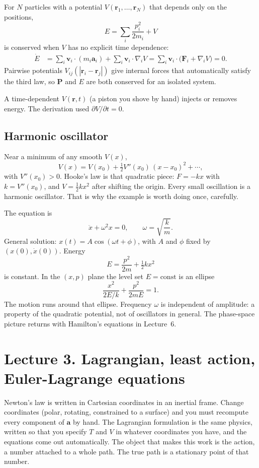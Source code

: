 \documentclass[11pt]{article}
\numberwithin{equation}{section}
\newcommand{\vect}[1]{\mathbf{#1}}
\begin{document}
For $N$ particles with a potential $V(\vect{r}_1,\ldots,\vect{r}_N)$ that depends only on the positions,
\[
E = \sum_i \frac{p_i^2}{2m_i} + V
\]
is conserved when $V$ has no explicit time dependence:
\begin{align*}
\dot E
&= \sum_i \vect{v}_i\cdot(m_i\vect{a}_i)
+ \sum_i \vect{v}_i\cdot\nabla_i V
= \sum_i \vect{v}_i\cdot\bigl(\vect{F}_i + \nabla_i V\bigr)
= 0.
\end{align*}
Pairwise potentials $V_{ij}(|\vect{r}_i-\vect{r}_j|)$ give internal forces that automatically satisfy the third law, so $\vect{P}$ and $E$ are both conserved for an isolated system.

A time-dependent $V(\vect{r},t)$ (a piston you shove by hand) injects or removes energy. The derivation used $\partial V/\partial t=0$.

\subsection{Harmonic oscillator}

Near a minimum of any smooth $V(x)$,
\[
V(x) = V(x_0) + \tfrac12 V''(x_0)\,(x-x_0)^2 + \cdots,
\]
with $V''(x_0)>0$. Hooke's law is that quadratic piece: $F=-kx$ with $k=V''(x_0)$, and $V=\tfrac12 k x^2$ after shifting the origin. Every small oscillation is a harmonic oscillator. That is why the example is worth doing once, carefully.

The equation is
\[
\ddot{x} + \omega^2 x = 0,\qquad \omega = \sqrt{\frac{k}{m}}.
\]
General solution: $x(t)=A\cos(\omega t+\phi)$, with $A$ and $\phi$ fixed by $(x(0),\dot x(0))$. Energy
\[
E = \frac{p^2}{2m} + \tfrac12 k x^2
\]
is constant. In the $(x,p)$ plane the level set $E=\mathrm{const}$ is an ellipse
\[
\frac{x^2}{2E/k} + \frac{p^2}{2mE} = 1.
\]
The motion runs around that ellipse. Frequency $\omega$ is independent of amplitude: a property of the quadratic potential, not of oscillators in general. The phase-space picture returns with Hamilton's equations in Lecture~6.

\section{Lecture 3. Lagrangian, least action, Euler-Lagrange equations}

Newton's law is written in Cartesian coordinates in an inertial frame. Change coordinates (polar, rotating, constrained to a surface) and you must recompute every component of $\vect{a}$ by hand. The Lagrangian formulation is the same physics, written so that you specify $T$ and $V$ in whatever coordinates you have, and the equations come out automatically. The object that makes this work is the action, a number attached to a whole path. The true path is a stationary point of that number.
\end{document}
